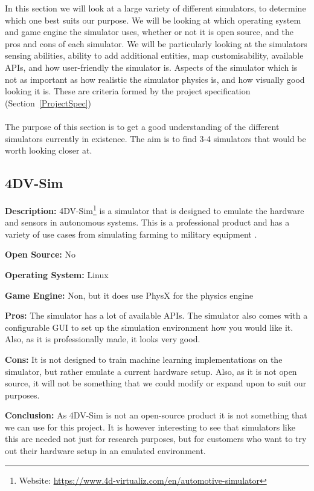 In this section we will look at a large variety of different simulators, to determine which one best suits our purpose. We will be looking at which operating system and game engine the simulator uses, whether or not it is open source, and the pros and cons of each simulator. We will be particularly looking at the simulators sensing abilities, ability to add additional entities, map customisability, available APIs, and how user-friendly the simulator is. Aspects of the simulator which is not as important as how realistic the simulator physics is, and how visually good looking it is. These are criteria formed by the project specification (Section~\ref{ProjectSpec})
\\~\\
The purpose of this section is to get a good understanding of the different simulators currently in existence. The aim is to find 3-4 simulators that would be worth looking closer at.

\subsection{4DV-Sim}
\textbf{Description:} 4DV-Sim\footnote{Website: \url{https://www.4d-virtualiz.com/en/automotive-simulator}} is a simulator that is designed to emulate the hardware and sensors in autonomous systems. This is a professional product and has a variety of use cases from simulating farming to military equipment \cite{4dv-simulator}.

\textbf{Open Source:} No

\textbf{Operating System:} Linux

\textbf{Game Engine:} Non, but it does use PhysX for the physics engine

\textbf{Pros:} The simulator has a lot of available APIs. The simulator also comes with a configurable GUI to set up the simulation environment how you would like it. Also, as it is professionally made, it looks very good.   

\textbf{Cons:} It is not designed to train machine learning implementations on the simulator, but rather emulate a current hardware setup. Also, as it is not open source, it will not be something that we could modify or expand upon to suit our purposes. 

\textbf{Conclusion:} As 4DV-Sim is not an open-source product it is not something that we can use for this project. It is however interesting to see that simulators like this are needed not just for research purposes, but for customers who want to try out their hardware setup in an emulated environment.


